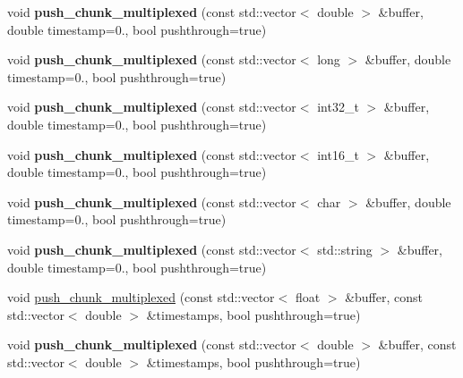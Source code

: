\begin{DoxyCompactItemize}
void {\bfseries push\+\_\+chunk\+\_\+multiplexed} (const std\+::vector$<$ double $>$ \&buffer, double timestamp=0., bool pushthrough=true)
\item 
\mbox{\label{classlsl_1_1stream__outlet_abe328c3200c383d160ca0e00029b8124}} 
void {\bfseries push\+\_\+chunk\+\_\+multiplexed} (const std\+::vector$<$ long $>$ \&buffer, double timestamp=0., bool pushthrough=true)
\item 
\mbox{\label{classlsl_1_1stream__outlet_a341840ed1504e2cfa0cc9c15263e030a}} 
void {\bfseries push\+\_\+chunk\+\_\+multiplexed} (const std\+::vector$<$ int32\+\_\+t $>$ \&buffer, double timestamp=0., bool pushthrough=true)
\item 
\mbox{\label{classlsl_1_1stream__outlet_a874e84f39bf470f755aa46da300244f6}} 
void {\bfseries push\+\_\+chunk\+\_\+multiplexed} (const std\+::vector$<$ int16\+\_\+t $>$ \&buffer, double timestamp=0., bool pushthrough=true)
\item 
\mbox{\label{classlsl_1_1stream__outlet_af1bedf881293459205b9ba5df7b92051}} 
void {\bfseries push\+\_\+chunk\+\_\+multiplexed} (const std\+::vector$<$ char $>$ \&buffer, double timestamp=0., bool pushthrough=true)
\item 
\mbox{\label{classlsl_1_1stream__outlet_a554027868fa9710470f0c3f057904b4b}} 
void {\bfseries push\+\_\+chunk\+\_\+multiplexed} (const std\+::vector$<$ std\+::string $>$ \&buffer, double timestamp=0., bool pushthrough=true)
\item 
void \hyperlink{classlsl_1_1stream__outlet_a5944abd4386a9568441ddb352e8df71f}{push\+\_\+chunk\+\_\+multiplexed} (const std\+::vector$<$ float $>$ \&buffer, const std\+::vector$<$ double $>$ \&timestamps, bool pushthrough=true)
\item 
\mbox{\label{classlsl_1_1stream__outlet_ad0a2c2b78e18b423e34ed0282df6b919}} 
void {\bfseries push\+\_\+chunk\+\_\+multiplexed} (const std\+::vector$<$ double $>$ \&buffer, const std\+::vector$<$ double $>$ \&timestamps, bool pushthrough=true)
\item 
\mbox{\label{classlsl_1_1stream__outlet_a9075bd46bb9f2d1a0d494dbb7772eb48}} 

\end{DoxyCompactItemize}
